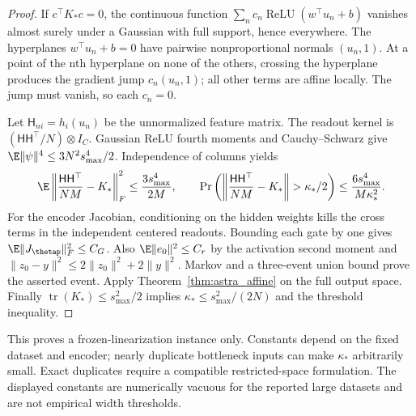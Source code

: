 \begin{proof}
If $c^\top K_*c=0$, the continuous function
$\sum_nc_n\operatorname{ReLU}(w^\top u_n+b)$ vanishes almost surely
under a Gaussian with full support, hence everywhere. The hyperplanes
$w^\top u_n+b=0$ have pairwise nonproportional normals $(u_n,1)$.
At a point of the nth hyperplane on none of the others, crossing the
hyperplane produces the gradient jump $c_n(u_n,1)$; all other terms
are affine locally. The jump must vanish, so each $c_n=0$.

Let $\mathsf H_{ni}=h_i(u_n)$ be the unnormalized feature matrix.
The readout kernel is $(\mathsf H\mathsf H^\top/N)\otimes I_C$.
Gaussian ReLU fourth moments and Cauchy--Schwarz give
$\E\|\psi\|^4\le3N^2s_{\max}^4/2$. Independence of columns yields
\[
 \E\left\|\frac{\mathsf H\mathsf H^\top}{NM}-K_*\right\|_F^2
 \le\frac{3s_{\max}^4}{2M},\qquad
 \Pr\left(\left\|\frac{\mathsf H\mathsf H^\top}{NM}-K_*\right\|>
                  \kappa_*/2\right)
 \le\frac{6s_{\max}^4}{M\kappa_*^2}.
\]
For the encoder Jacobian, conditioning on the hidden weights kills the
cross terms in the independent centered readouts. Bounding each gate by
one gives $\E\|J_\thetap\|_F^2\le C_G$. Also
$\E\|e_0\|^2\le C_r$ by the activation second moment and
$\|z_0-y\|^2\le2\|z_0\|^2+2\|y\|^2$.
Markov and a three-event union bound prove the asserted event.
Apply Theorem~\ref{thm:astra_affine} on the full output space.
Finally $\operatorname{tr}(K_*)\le s_{\max}^2/2$ implies
$\kappa_*\le s_{\max}^2/(2N)$ and the threshold inequality.
\end{proof}
\begin{remark}
This proves a frozen-linearization instance only. Constants depend on
the fixed dataset and encoder; nearly duplicate bottleneck inputs can
make $\kappa_*$ arbitrarily small. Exact duplicates require a compatible
restricted-space formulation. The displayed constants are numerically
vacuous for the reported large datasets and are not empirical width thresholds.
\end{remark}

